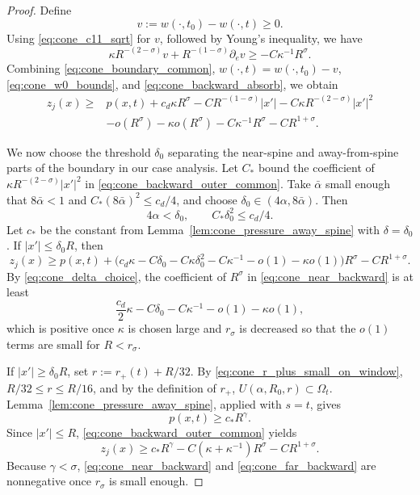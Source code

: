 \documentclass[10pt,a4paper]{amsart}
\begin{document}
\begin{proof}
 Define
\[
    v:=w(\cdot,t_0)-w(\cdot,t)\geq0.
\]
Using \eqref{eq:cone_c11_sqrt} for \(v\), followed by Young's inequality, we have
\begin{equation}\label{eq:cone_backward_absorb}
    \kappa R^{-(2-\sigma)}v+R^{-(1-\sigma)}\partial_ev
    \geq -C\kappa^{-1}R^\sigma.
\end{equation}
Combining \eqref{eq:cone_boundary_common}, \(w(\cdot,t)=w(\cdot,t_0)-v\),
\eqref{eq:cone_w0_bounds}, and \eqref{eq:cone_backward_absorb}, we obtain
\begin{equation}\label{eq:cone_backward_outer_common}
    \begin{aligned}
    z_j(x)\geq{}&p(x,t)+c_d\kappa R^\sigma
    -CR^{-(1-\sigma)}|x'|
    -C\kappa R^{-(2-\sigma)}|x'|^2\\
    &-o(R^\sigma)-\kappa o(R^\sigma)
    -C\kappa^{-1}R^\sigma-CR^{1+\sigma}.
    \end{aligned}
\end{equation}

We now choose the threshold \(\delta_0\) separating the near-spine and
away-from-spine parts of the boundary in our case analysis. Let \(C_*\) bound
the coefficient of \(\kappa R^{-(2-\sigma)}|x'|^2\) in
\eqref{eq:cone_backward_outer_common}. Take \(\bar\alpha\) small enough that \(8\bar\alpha<1\) and
\(C_*(8\bar\alpha)^2\leq c_d/4\), and choose
\(\delta_0\in(4\alpha,8\bar\alpha)\). Then
\begin{equation}\label{eq:cone_delta_choice}
    4\alpha<\delta_0,
    \qquad
    C_*\delta_0^2\leq c_d/4 .
\end{equation}
Let \(c_*\) be the constant from
Lemma~\ref{lem:cone_pressure_away_spine} with \(\delta=\delta_0\). If \(|x'|\leq\delta_0R\), then
\begin{equation}\label{eq:cone_near_backward}
    z_j(x)\geq p(x,t)
    +\bigl(c_d\kappa-C\delta_0-C\kappa\delta_0^2-C\kappa^{-1}-o(1)-\kappa o(1)\bigr)R^\sigma
    -CR^{1+\sigma}.
\end{equation}
By \eqref{eq:cone_delta_choice}, the coefficient of \(R^\sigma\) in
\eqref{eq:cone_near_backward} is at least
\[
    \frac{c_d}{2}\kappa-C\delta_0-C\kappa^{-1}-o(1)-\kappa o(1),
\]
which is positive once \(\kappa\) is chosen large and \(r_\sigma\) is
decreased so that the \(o(1)\) terms are small for \(R<r_\sigma\).





If \(|x'|\geq\delta_0R\), set
\(r:=r_+(t)+R/32\). By
\eqref{eq:cone_r_plus_small_on_window}, \(R/32\leq r\leq R/16\), and by
the definition of \(r_+\), \(U(\alpha,R_0,r)\subset\Omega_t\).
Lemma~\ref{lem:cone_pressure_away_spine}, applied with \(s=t\), gives
\[
    p(x,t)\geq c_*R^\gamma.
\]
Since \(|x'|\leq R\), \eqref{eq:cone_backward_outer_common} yields
\begin{equation}\label{eq:cone_far_backward}
    z_j(x)\geq
    c_*R^\gamma-C(\kappa+\kappa^{-1})R^\sigma-CR^{1+\sigma}.
\end{equation}
Because \(\gamma<\sigma\), \eqref{eq:cone_near_backward} and
\eqref{eq:cone_far_backward} are nonnegative once \(r_\sigma\) is small enough.


\end{proof}
\end{document}

